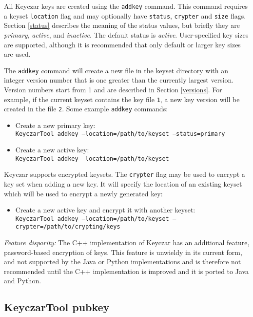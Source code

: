 \documentclass{llncs}
\begin{document}
All Keyczar keys are created using the {\tt addkey} command. This
command requires a keyset {\tt location} flag and may optionally have
{\tt status}, {\tt crypter} and {\tt size} flags. Section \ref{status}
describes the meaning of the status values, but briefly they are {\it
  primary}, {\it active}, and {\it inactive}. The default status is
{\it active}. User-specified key sizes are supported, although it is
recommended that only default or larger key sizes are used.

The {\tt addkey} command will create a new file in the keyset
directory with an integer version number that is one greater than the
currently largest version.  Version numbers start from 1 and are
described in Section \ref{versions}. For example, if the current
keyset contains the key file {\tt 1}, a new key version will be
created in the file {\tt 2}. Some example {\tt addkey} commands:


\begin{itemize}
\item Create a new primary key: \\
{\tt KeyczarTool addkey --location=/path/to/keyset --status=primary}
\item Create a new active key: \\
{\tt KeyczarTool addkey --location=/path/to/keyset}
\end{itemize}

Keyczar supports encrypted keysets. The {\tt crypter} flag may be used
to encrypt a key set when adding a new key. It will specify the
location of an existing keyset which will be used to encrypt a newly
generated key:

\begin{itemize}
\item Create a new active key and encrypt it with another keyset: \\
{\tt KeyczarTool addkey --location=/path/to/keyset
--crypter=/path/to/crypting/keys}
\end{itemize}

\emph{Feature disparity:} The C++ implementation of Keyczar has an
additional feature, password-based encryption of keys.  This feature
is unwieldy in its current form, and not supported by the Java or
Python implementations and is therefore not recommended until the C++
implementation is improved and it is ported to Java and Python.

\subsection{KeyczarTool pubkey}
\end{document}
